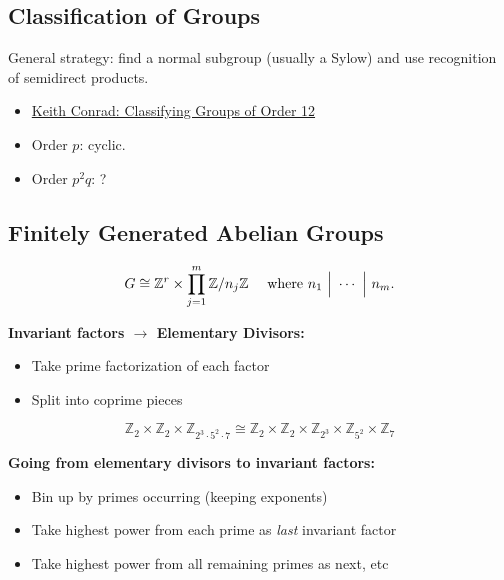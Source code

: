 \hypertarget{classification-of-groups}{%
\subsection{Classification of Groups}\label{classification-of-groups}}

General strategy: find a normal subgroup (usually a Sylow) and use
recognition of semidirect products.

\begin{itemize}
\tightlist
\item
  \href{https://kconrad.math.uconn.edu/blurbs/grouptheory/group12.pdf}{Keith
  Conrad: Classifying Groups of Order 12}
\item
  Order \(p\): cyclic.
\item
  Order \(p^2q\): ?
\end{itemize}

\hypertarget{finitely-generated-abelian-groups}{%
\subsection{Finitely Generated Abelian
Groups}\label{finitely-generated-abelian-groups}}

\[
G \cong {\mathbb{Z}}^r \times \prod_{j=1}^m {\mathbb{Z}}/n_j{\mathbb{Z}}
\quad \text{ where } n_1 {~\Bigm|~}\cdots {~\Bigm|~}n_m
.\]

\textbf{Invariant factors \(\longrightarrow\) Elementary Divisors:}

\begin{itemize}
\tightlist
\item
  Take prime factorization of each factor
\item
  Split into coprime pieces
\end{itemize}

\[
{\mathbb{Z}}_2 \times {\mathbb{Z}}_2 \times {\mathbb{Z}}_{2^3 \cdot 5^2 \cdot 7}
\cong
{\mathbb{Z}}_2 \times {\mathbb{Z}}_2 \times {\mathbb{Z}}_{2^3} \times {\mathbb{Z}}_{5^2} \times {\mathbb{Z}}_7
\]

\textbf{Going from elementary divisors to invariant factors:}

\begin{itemize}
\tightlist
\item
  Bin up by primes occurring (keeping exponents)
\item
  Take highest power from each prime as \emph{last} invariant factor
\item
  Take highest power from all remaining primes as next, etc
\end{itemize}

